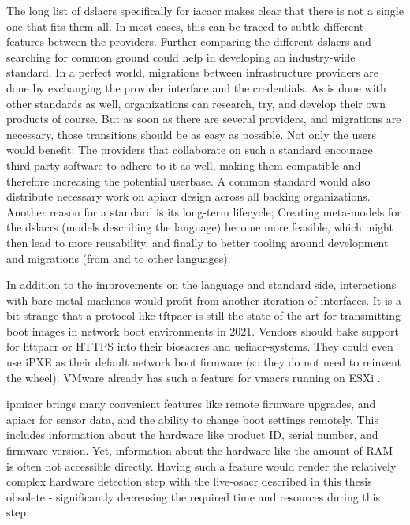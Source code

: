 
The long list of \gls{dslacr}s specifically for \gls{iacacr} makes clear that there is not a single one that fits them all. In most cases, this can be traced to subtle different features between the providers. Further comparing the different \gls{dslacr}s and searching for common ground could help in developing an industry-wide standard. In a perfect world, migrations between infrastructure providers are done by exchanging the provider interface and the credentials. As is done with other standards as well, organizations can research, try, and develop their own products of course. But as soon as there are several providers, and migrations are necessary, those transitions should be as easy as possible. Not only the users would benefit: The providers that collaborate on such a standard encourage third-party software to adhere to it as well, making them compatible and therefore increasing the potential userbase. A common standard would also distribute necessary work on \gls{apiacr} design across all backing organizations. Another reason for a standard is its long-term lifecycle; Creating meta-models for the \gls{dslacr}s (models describing the language) become more feasible, which might then lead to more reusability, and finally to better tooling around development and migrations (from and to other languages).


In addition to the improvements on the language and standard side, interactions with bare-metal machines would profit from another iteration of interfaces. It is a bit strange that a protocol like \gls{tftpacr} is still the state of the art for transmitting boot images in network boot environments in 2021. Vendors should bake support for \gls{httpacr} or HTTPS into their \gls{biosacr}es and \gls{uefiacr}-systems. They could even use iPXE as their default network boot firmware (so they do not need to reinvent the wheel). VMware already has such a feature for \gls{vmacr}s running on ESXi \cite{ipxe_vmware}.

\Gls{ipmiacr} brings many convenient features like remote firmware upgrades, and \gls{apiacr} for sensor data, and the ability to change boot settings remotely. This includes information about the hardware like product ID, serial number, and firmware version. Yet, information about the hardware like the amount of RAM is often not accessible directly. Having such a feature would render the relatively complex hardware detection step with the live-\gls{osacr} described in this thesis obsolete - significantly decreasing the required time and resources during this step.

